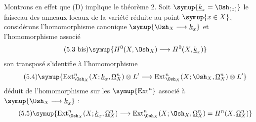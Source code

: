Montrons en effet que (D) implique le théorème 2. Soit
$\symup{\underline{k}_x=\Osh_{(x)}}$ le faisceau des anneaux locaux de la variété réduite au point
$\symup{x\in X}$, considérons l'homomorphisme canonique
$\symup{\Osh_X\longrightarrow \underline{k}_x}$ et l'homomorphisme associé
\begin{equation}\tag{5.3 bis}
  \symup{H^{0}(X,\Osh_X)\longrightarrow H^{0}(X,\underline{k}_x)}
\end{equation}
son transposé s'identifie à l'homomorphisme
\begin{equation}\tag{5.4}
  \symup{\operatorname{Ext}_{\Osh_X}^{n}(X;\underline{k}_x,\underline{\Omega}_X^{n})\otimes L'
  \longrightarrow
  \operatorname{Ext}_{\Osh_X}^{n}(X;\Osh_X,\underline{\Omega}_X^{n})\otimes L'}
\end{equation}
déduit de l'homomorphisme sur les $\symup{\operatorname{Ext}^{n}}$ associé à
$\symup{\Osh_X\longrightarrow \underline{k}_x}$ :
\begin{equation}\tag{5.5}
  \symup{\operatorname{Ext}_{\Osh_X}^{n}(X;\underline{k}_x,\underline{\Omega}_X^{n})
  \longrightarrow
  \operatorname{Ext}_{\Osh_X}^{n}(X;\Osh_X,\underline{\Omega}_X^{n})
  =H^{n}(X,\underline{\Omega}_X^{n})}
\end{equation}

